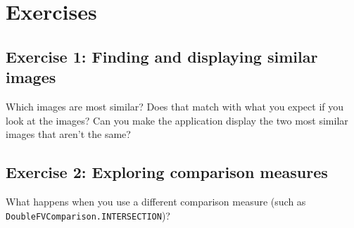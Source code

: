 \documentclass[10pt,a4paper,twoside,extrafontsizes]{memoir}
\begin{document}
\section*{Exercises}
\subsection*{Exercise 1: Finding and displaying similar images}
Which images are most similar?  Does that match with what you expect if you look at the 
images?  Can you make the application display the two most similar images that aren't the same?

\subsection*{Exercise 2: Exploring comparison measures}
What happens when you use a different comparison measure (such as 
\verb+DoubleFVComparison.INTERSECTION+)?
\end{document}
